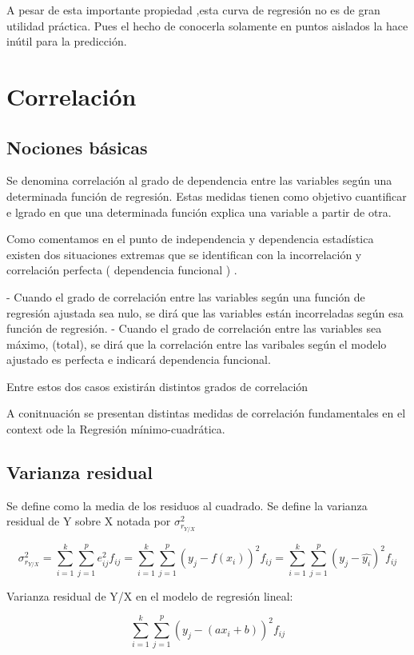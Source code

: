 \documentclass{article}
\begin{document}
A pesar de esta importante propiedad ,esta curva de regresión no es de gran utilidad práctica. Pues el hecho de conocerla solamente en puntos aislados la hace inútil para la predicción.


\section{Correlación}
\subsection{Nociones básicas}

Se denomina correlación al grado de dependencia entre las variables según una determinada función de regresión. Estas medidas tienen como objetivo cuantificar e lgrado en que una determinada función explica una variable a partir de otra. 

Como comentamos en el punto de independencia y dependencia estadística existen dos situaciones extremas que se identifican con la incorrelación y correlación perfecta ( dependencia funcional ) .

- Cuando el grado de correlación entre las variables según una función de regresión ajustada sea nulo, se dirá que las variables están incorreladas según esa función de regresión.
- Cuando el grado de correlación entre las variables sea máximo, (total), se dirá que la correlación entre las varibales según el modelo ajustado es perfecta e indicará dependencia funcional.

Entre estos dos casos existirán distintos grados de correlación

A conitnuación se presentan distintas medidas de correlación fundamentales en el context ode la Regresión mínimo-cuadrática.

\subsection{Varianza residual}
Se define como la media de los residuos al cuadrado. Se define la varianza residual de Y sobre X notada por $\sigma_{r_{Y/X}}^2 $

$$ \sigma_{r_{Y/X}}^2 = \sum_{i=1}^k \sum_{j=1}^p e_{ij}^2 f_{ij} =  \sum_{i=1}^k \sum_{j=1}^p ( y_j - f(x_i))^2 f_{ij} = \sum_{i=1}^k \sum_{j=1}^p (y_j -\hat{y_i})^2 f_{ij} $$

Varianza residual de Y/X en el modelo de regresión lineal:

$$ \sum_{i=1}^k \sum_{j=1}^p ( y_j - (ax_i +b) )^2 f_{ij} $$
\end{document}
